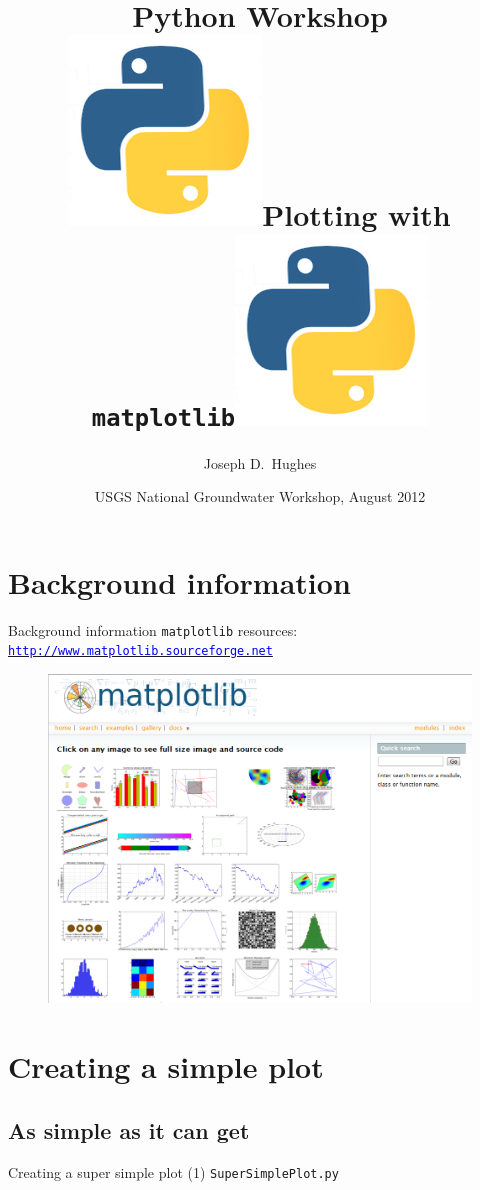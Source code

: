 \documentclass[t]{beamer}
\title[]{Python Workshop\\
 \includegraphics[scale=0.055]{figures/python-app.png}\hspace{5 pt}Plotting with \texttt{matplotlib}\hspace{5 pt}\includegraphics[scale=0.055]{figures/python-app.png} }
\author[Hughes] %
{Joseph D.~Hughes}
\institute[USGS] %
{
  U.S. Geological Survey\\
  Florida Water Science Center, Tampa, Florida USA
  }
\date[UQ12] %
{USGS National Groundwater Workshop, August 2012}
\begin{document}
\begin{frame}
  \titlepage
\end{frame}


\section{Background information}
\begin{frame}{Background information}
	\texttt{matplotlib} resources: \href{http://www.matplotlib.sourceforge.net}{\texttt{\small{\textcolor{blue}{http://www.matplotlib.sourceforge.net}}}}
	\begin{figure}[ht]
		\centering
		\includegraphics[height=0.6\textheight]{figures/matplotlib_gallery.png}
	\end{figure}
\end{frame}


\section{Creating a simple plot}
\subsection{As simple as it can get}
\begin{frame}{Creating a super simple plot (1)}
  \small{\texttt{SuperSimplePlot.py}}
  \vspace{-15pt}\begin{figure}[ht]
  \centering
        \lstset{numbers=left}
        
   \end{figure}
\end{frame}
\end{document}
